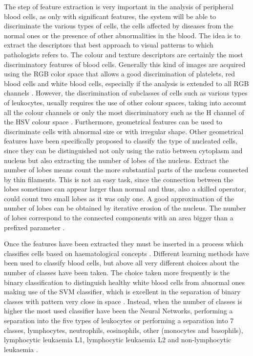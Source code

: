 \documentclass[final,a4paper,12pt,english]{UnicaPhdThesis3}
\begin{document}
The step of feature extraction is very important in the analysis of peripheral blood cells, as only with significant features, the system will be able to discriminate the various types of cells, the cells affected by diseases from the normal ones or the presence of other abnormalities in the blood. The idea is to extract the descriptors that best approach to visual patterns to which pathologists refers to. The colour and texture descriptors are certainly the most discriminatory features of blood cells. Generally this kind of images are acquired using the RGB color space that allows a good discrimination of platelets, red blood cells and white blood cells, especially if the analysis is extended to all RGB channels \cite{Angulo}. However, the discrimination of subclasses of cells such as various types of leukocytes, usually requires the use of other colour spaces, taking into account all the colour channels or only the most discriminatory such as the H channel of the HSV colour space \cite{Hengen}. Furthermore, geometrical features can be used to discriminate cells with abnormal size or with irregular shape. Other geometrical features have been specifically proposed to classify the type of nucleated cells, since they can be distinguished not only using the ratio between cytoplasm and nucleus \cite{Piuri, Sco05, Sco06} but also extracting the number of lobes of the nucleus. Extract the number of lobes means count the more substantial parts of the nucleus connected by thin filaments. This is not an easy task, since the connection between the lobes sometimes can appear larger than normal and thus, also a skilled operator, could count two small lobes as it was only one. A good approximation of the number of lobes can be obtained by iterative erosion of the nucleus. The number of lobes correspond to the connected components with an area bigger than a prefixed parameter \cite{Piuri}.  

Once the features have been extracted they must be inserted in a process which classifies cells based on haematological concepts \cite{Biondi, Serbouti}. Different learning methods have been used to classify blood cells, but above all very different choices about the number of classes have been taken. The choice taken more frequently is the binary classification to distinguish healthy white blood cells from abnormal ones making use of the SVM classifier, which is excellent in the separation of binary classes with pattern very close in space \cite{Mohapatra10a, Mohapatra10b, Mohapatra10c, Mohapatra14}. Instead, when the number of classes is higher the most used classifier have been the Neural Networks, performing a separation into the five types of leukocytes \cite{Sco06} or performing a separation into 7 classes, lymphocytes, neutrophils, eosinophils, other (monocytes and basophils), lymphocytic leukaemia L1, lymphocytic leukaemia L2 and non-lymphocytic leukaemia \cite{Buavirat}. 
\end{document}
